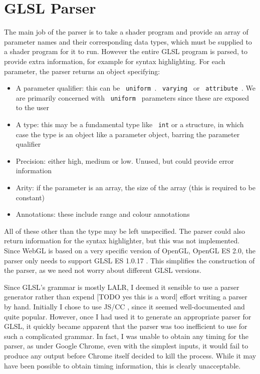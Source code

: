 \documentclass[12pt,twoside,notitlepage]{report}
\begin{document}
\section{GLSL Parser}
The main job of the parser is to take a shader program and provide an array of parameter names and their corresponding data types, which must be supplied to a shader program for it to run. However the entire GLSL program is parsed, to provide extra information, for example for syntax highlighting. For each parameter, the parser returns an object specifying:
\begin{itemize}
  \item A parameter qualifier: this can be \texttt{ uniform }. \texttt{ varying } or \texttt{ attribute }. We are primarily concerned with \texttt{ uniform } parameters since these are exposed to the user
  \item A type: this may be a fundamental type like \texttt{ int} or a structure, in which case the type is an object like a parameter object, barring the parameter qualifier
  \item Precision: either high, medium or low. Unused, but could provide error information
  \item Arity: if the parameter is an array, the size of the array (this is required to be constant)
  \item Annotations: these include range and colour annotations
\end{itemize}
All of these other than the type may be left unspecified. The parser could also return information for the syntax highlighter, but this was not implemented. Since WebGL is based on a very specific version of OpenGL, OpenGL ES 2.0, the parser only needs to support GLSL ES 1.0.17 \cite{glsl-spec}\cite{webgl-spec}. This simplifies the construction of the parser, as we need not worry about different GLSL versions.

Since GLSL's grammar is mostly LALR, I deemed it sensible to use a parser generator rather than expend [TODO yes this is a word] effort writing a parser by hand. Initially I chose to use JS/CC \cite{js-cc}, since it seemed well-documented and quite popular. However, once I had used it to generate an appropriate parser for GLSL, it quickly became apparent that the parser was too inefficient to use for such a complicated grammar. In fact, I was unable to obtain any timing for the parser, as under Google Chrome, even with the simplest inputs, it would fail to produce any output before Chrome itself decided to kill the process. While it may have been possible to obtain timing information, this is clearly unacceptable. 
\end{document}
